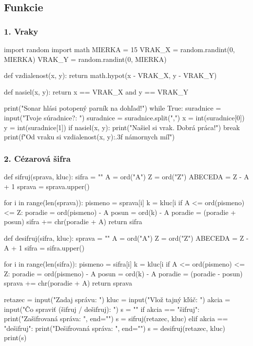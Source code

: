 \subsection{Funkcie}
\subsubsection*{1. Vraky}
\begin{solution}
import random
import math
MIERKA = 15
VRAK_X = random.randint(0, MIERKA)
VRAK_Y = random.randint(0, MIERKA)

def vzdialenost(x, y):
    return math.hypot(x - VRAK_X, y - VRAK_Y)
  
def nasiel(x, y):
    return x == VRAK_X and y == VRAK_Y

print("Sonar hlási potopený parník na dohľad!")
while True:
    suradnice = input("Tvoje súradnice?: ")
    suradnice = suradnice.split(",")
    x = int(suradnice[0])
    y = int(suradnice[1])
    if nasiel(x, y):
        print("Našiel si vrak. Dobrá práca!")
        break
    print(f"Od vraku si {vzdialenost(x, y):.3f} námornych míľ")
\end{solution}

\subsubsection*{2. Cézarová šifra}
\begin{solution}
def sifruj(sprava, kluc):
    sifra = ""
    A = ord("A")
    Z = ord("Z")
    ABECEDA = Z - A + 1
    sprava = sprava.upper()

    for i in range(len(sprava)):
        pismeno = sprava[i]
        k = kluc[i %
        if A <= ord(pismeno) <= Z:
            poradie = ord(pismeno) - A
            posun = ord(k) - A
            poradie = (poradie + posun) %
            sifra += chr(poradie + A)
    return sifra

def desifruj(sifra, kluc):
    sprava = ""
    A = ord("A")
    Z = ord("Z")
    ABECEDA = Z - A + 1
    sifra = sifra.upper()

    for i in range(len(sifra)):
        pismeno = sifra[i]
        k = kluc[i %
        if A <= ord(pismeno) <= Z:
            poradie = ord(pismeno) - A
            posun = ord(k) - A
            poradie = (poradie - posun) %
            sprava += chr(poradie + A)
    return sprava

retazec = input("Zadaj správu: ")
kluc = input("Vlož tajný kľúč: ")
akcia = input("Čo spraviť (šifruj / dešifruj): ")
s = ""
if akcia == "šifruj":
    print("Zašifrovaná správa: ", end="")
    s = sifruj(retazec, kluc)
elif akcia == "dešifruj":
    print("Dešifrovaná správa: ", end="")
    s = desifruj(retazec, kluc)
print(s)
\end{solution}

